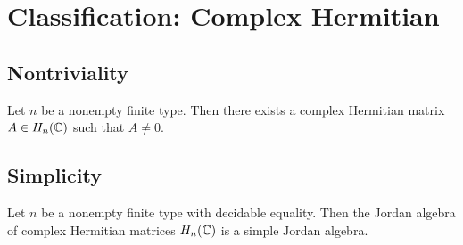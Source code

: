 \section{Classification: Complex Hermitian}

\subsection{Nontriviality}

\begin{theorem}[nontrivial]
Let $n$ be a nonempty finite type. Then there exists a complex Hermitian matrix $A \in H_n(\mathbb{C})$ such that $A \ne 0$.
\end{theorem}

\subsection{Simplicity}

\begin{proposition}[isSimple]
Let $n$ be a nonempty finite type with decidable equality. Then the Jordan algebra of complex Hermitian matrices $H_n(\mathbb{C})$ is a simple Jordan algebra.
\end{proposition}
